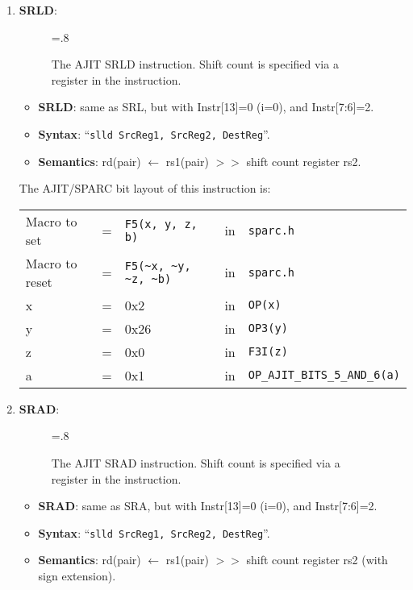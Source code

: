 \begin{enumerate}
\begin{enumerate}
  \item \textbf{SRLD}:\\
    \begin{center}
      \begin{figure}[h]
        \centering
        \epsfxsize=.8\linewidth
        \caption{The AJIT SRLD instruction.   Shift count is specified
          via a register in the instruction.}
        \label{fig:ajit:srldcc:insn}
      \end{figure}
    \end{center}
    \begin{itemize}
    \item []\textbf{SRLD}: same as SRL, but with Instr[13]=0 (i=0),
      and Instr[7:6]=2.
    \item []\textbf{Syntax}: ``\texttt{slld SrcReg1, SrcReg2,
        DestReg}''.
    \item []\textbf{Semantics}: rd(pair) $\leftarrow$ rs1(pair) $>>$
      shift count register rs2.
    \end{itemize}

    The AJIT/SPARC bit layout of this instruction is:

    \begin{tabular}[h]{lclcl}
      Macro to set   &=&  \verb|F5(x, y, z, b)|     &in& \verb|sparc.h|     \\
      Macro to reset &=&  \verb|F5(~x, ~y, ~z, ~b)| &in& \verb|sparc.h|     \\
      x &=& 0x2      &in& \verb|OP(x)| \\
      y &=& 0x26     &in& \verb|OP3(y)| \\
      z &=& 0x0      &in& \verb|F3I(z)| \\
      a &=& 0x1      &in& \verb|OP_AJIT_BITS_5_AND_6(a)|
    \end{tabular}

  \item \textbf{SRAD}:\\
    \begin{center}
      \begin{figure}[h]
        \centering
        \epsfxsize=.8\linewidth
        \caption{The AJIT  SRAD instruction.   Shift count is specified
          via a register in the instruction.}
        \label{fig:ajit:slldcc:insn}
      \end{figure}
    \end{center}
    \begin{itemize}
    \item []\textbf{SRAD}: same as SRA, but with Instr[13]=0 (i=0),
      and Instr[7:6]=2.
    \item []\textbf{Syntax}: ``\texttt{slld SrcReg1, SrcReg2,
        DestReg}''.
    \item []\textbf{Semantics}: rd(pair) $\leftarrow$ rs1(pair) $>>$
      shift count register rs2 (with sign extension).
    \end{itemize}


\end{enumerate}
\end{enumerate}
